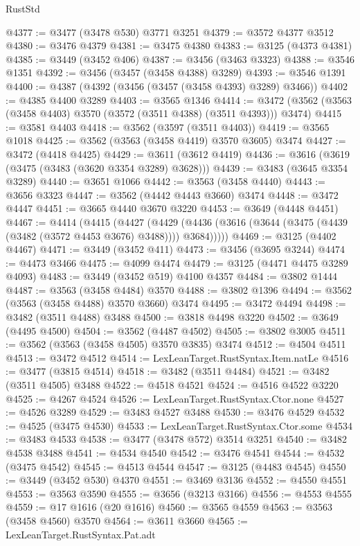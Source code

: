 \begin{lexlean}{RustStd}
\begin{coremodule}
@4377 := @3477 (@3478 @530) @3771 @3251
@4379 := @3572 @4377 @3512
@4380 := @3476 @4379
@4381 := @3475 @4380
@4383 := @3125 (@4373 @4381)
@4385 := @3449 (@3452 @406)
@4387 := @3456 (@3463 @3323)
@4388 := @3546 @1351
@4392 := @3456 (@3457 (@3458 @4388) @3289)
@4393 := @3546 @1391
@4400 := @4387 (@4392 (@3456 (@3457 (@3458 @4393) @3289) @3466))
@4402 := @4385 @4400 @3289
@4403 := @3565 @1346
@4414 := @3472 (@3562 (@3563 (@3458 @4403) @3570 (@3572 (@3511 @4388) (@3511 @4393))) @3474)
@4415 := @3581 @4403
@4418 := @3562 (@3597 (@3511 @4403))
@4419 := @3565 @1018
@4425 := @3562 (@3563 (@3458 @4419) @3570 @3605) @3474
@4427 := @3472 (@4418 @4425)
@4429 := @3611 (@3612 @4419)
@4436 := @3616 (@3619 (@3475 (@3483 (@3620 @3354 @3289) @3628)))
@4439 := @3483 (@3645 @3354 @3289)
@4440 := @3651 @1066
@4442 := @3563 (@3458 @4440)
@4443 := @3656 @3323
@4447 := @3562 (@4442 @4443 @3660) @3474
@4448 := @3472 @4447
@4451 := @3665 @4440 @3670 @3220
@4453 := @3649 (@4448 @4451)
@4467 := @4414
    (@4415
      (@4427
        (@4429 (@4436 (@3616 (@3644 (@3475 (@4439 (@3482 (@3572 @4453 @3676) @3488)))) @3684)))))
@4469 := @3125 (@4402 @4467)
@4471 := @3449 (@3452 @411)
@4473 := @3456 (@3695 @3244)
@4474 := @4473 @3466
@4475 := @4099 @4474
@4479 := @3125 (@4471 @4475 @3289 @4093)
@4483 := @3449 (@3452 @519) @4100 @4357
@4484 := @3802 @1444
@4487 := @3563 (@3458 @4484) @3570
@4488 := @3802 @1396
@4494 := @3562 (@3563 (@3458 @4488) @3570 @3660) @3474
@4495 := @3472 @4494
@4498 := @3482 (@3511 @4488) @3488
@4500 := @3818 @4498 @3220
@4502 := @3649 (@4495 @4500)
@4504 := @3562 (@4487 @4502)
@4505 := @3802 @3005
@4511 := @3562 (@3563 (@3458 @4505) @3570 @3835) @3474
@4512 := @4504 @4511
@4513 := @3472 @4512
@4514 := LexLeanTarget.RustSyntax.Item.natLe
@4516 := @3477 (@3815 @4514)
@4518 := @3482 (@3511 @4484)
@4521 := @3482 (@3511 @4505) @3488
@4522 := @4518 @4521
@4524 := @4516 @4522 @3220
@4525 := @4267 @4524
@4526 := LexLeanTarget.RustSyntax.Ctor.none
@4527 := @4526 @3289
@4529 := @3483 @4527 @3488
@4530 := @3476 @4529
@4532 := @4525 (@3475 @4530)
@4533 := LexLeanTarget.RustSyntax.Ctor.some
@4534 := @3483 @4533
@4538 := @3477 (@3478 @572) @3514 @3251
@4540 := @3482 @4538 @3488
@4541 := @4534 @4540
@4542 := @3476 @4541
@4544 := @4532 (@3475 @4542)
@4545 := @4513 @4544
@4547 := @3125 (@4483 @4545)
@4550 := @3449 (@3452 @530) @4370
@4551 := @3469 @3136
@4552 := @4550 @4551
@4553 := @3563 @3590
@4555 := @3656 (@3213 @3166)
@4556 := @4553 @4555
@4559 := @17 @1616 (@20 @1616)
@4560 := @3565 @4559
@4563 := @3563 (@3458 @4560) @3570
@4564 := @3611 @3660
@4565 := LexLeanTarget.RustSyntax.Pat.adt

\end{coremodule}
\end{lexlean}
